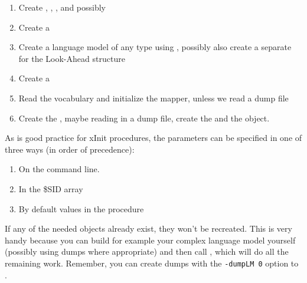 \begin{enumerate}

\item Create , , , and possibly 

\item Create a 

\item Create a language model of  any type using ,
possibly also create a separate  for the Look-Ahead
structure

\item Create a 

\item Read the vocabulary and initialize the mapper, unless we read a  dump file

\item  Create the ,  maybe reading in a dump file,
create the  and the  object.

\end{enumerate}

As is good practice for xInit procedures, the parameters can be 
specified in one of three ways (in order of precedence):

\begin{enumerate}
\item On the command line.
\item In the \$SID array
\item By default values in the procedure
\end{enumerate}

If any of the needed  objects already exist,  they won't be recreated.
This  is very handy  because  you can build   for example your complex
language model yourself (possibly using  dumps where appropriate)  and
then call , which will do all the remaining work.
Remember,  you   can  create      dumps  with  the
\texttt{-dumpLM 0} option to .

